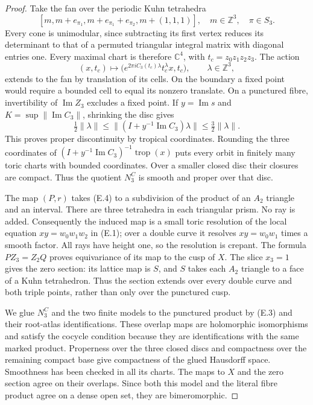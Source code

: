 \begin{proof}
Take the fan over the periodic Kuhn tetrahedra
\[
 [m,m+e_{\pi_1},m+e_{\pi_1}+e_{\pi_2},m+(1,1,1)],
 \quad m\in\mathbb Z^3,\quad\pi\in S_3.
 \tag{E.4}
\]
Every cone is unimodular, since subtracting its first vertex reduces
its determinant to that of a permuted triangular integral matrix with
diagonal entries one.  Every maximal chart is therefore $\mathbb C^4$,
with $t_c=z_0z_1z_2z_3$.  The action
\[
 (x,t_c)\longmapsto
 \bigl(e^{2\pi iC_3(t_c)\lambda}t_c^\lambda x,t_c\bigr),
 \qquad\lambda\in\mathbb Z^3,
 \tag{E.5}
\]
extends to the fan by translation of its cells.  On the boundary a
fixed point would require a bounded cell to equal its nonzero translate.
On a punctured fibre, invertibility of $\operatorname{Im}Z_3$ excludes
a fixed point.  If $y=\operatorname{Im}s$ and
$K=\sup\|\operatorname{Im}C_3\|$, shrinking the disc gives
\[
 \tfrac12\|\lambda\|\leq
 \|(I+y^{-1}\operatorname{Im}C_3)\lambda\|
 \leq\tfrac32\|\lambda\|.
\]
This proves proper discontinuity by tropical coordinates.  Rounding
the three coordinates of
$(I+y^{-1}\operatorname{Im}C_3)^{-1}\operatorname{trop}(x)$ puts every
orbit in finitely many toric charts with bounded coordinates.  Over a
smaller closed disc their closures are compact.  Thus the quotient
$N_3^C$ is smooth and proper over that disc.

The map $(P,r)$ takes (E.4) to a subdivision of the product of an
$A_2$ triangle and an interval.  There are three tetrahedra in each
triangular prism.  No ray is added.  Consequently the induced map is
a small toric resolution of the local equation
$xy=w_0w_1w_2$ in (E.1); over a double curve it resolves
$xy=w_0w_1$ times a smooth factor.  All rays have height one, so the
resolution is crepant.  The formula $PZ_3=Z_2Q$ proves equivariance
of its map to the cusp of $X$.  The slice $x_3=1$ gives the zero
section: its lattice map is $S$, and $S$ takes each $A_2$ triangle
to a face of a Kuhn tetrahedron.  Thus the section extends over every
double curve and both triple points, rather than only over the
punctured cusp.

We glue $N_3^C$ and the two finite models to the punctured product by
(E.3) and their root-atlas identifications.  These overlap maps are
holomorphic isomorphisms and satisfy the cocycle condition because
they are identifications with the same marked product.  Properness
over the three closed discs and compactness over the remaining compact
base give compactness of the glued Hausdorff space.  Smoothness has
been checked in all its charts.  The maps to $X$ and the zero section
agree on their overlaps.  Since both this model and the literal
fibre product agree on a dense open set, they are bimeromorphic.
\end{proof}

